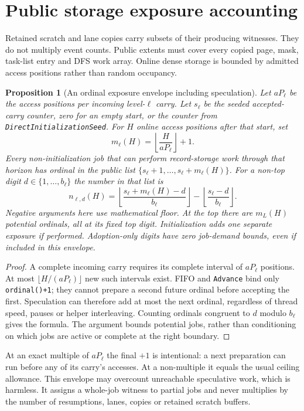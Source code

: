 \documentclass[11pt]{article}
\newtheorem{proposition}[theorem]{Proposition}
\theoremstyle{definition}
\theoremstyle{remark}
\begin{document}
\section{Public storage exposure accounting}
\label{sec:native-ledger}
Retained scratch and lane copies carry subsets of their producing witnesses.
They do not multiply event counts. Public extents must cover every copied
page, mask, task-list entry and DFS work array. Online dense storage is
bounded by admitted access positions rather than random occupancy.
\begin{proposition}[An ordinal exposure envelope including speculation]
\label{prop:ordinal-exposures}
Let $aP_\ell$ be the access positions per incoming level-$\ell$ carry.
Let $s_\ell$ be the seeded accepted-carry counter, zero for an empty
start, or the counter from \texttt{DirectInitializationSeed}. For $H$
online access positions after that start, set
\[
 m_\ell(H)=\left\lfloor\frac{H}{aP_\ell}\right\rfloor+1.
\]
Every non-initialization job that can perform record-storage work through
that horizon has ordinal in the public list
$\{s_\ell+1,\ldots,s_\ell+m_\ell(H)\}$.
For a non-top digit $d\in\{1,\ldots,b_\ell\}$ the number in that list is
\[
 n_{\ell,d}(H)=
 \left\lfloor\frac{s_\ell+m_\ell(H)-d}{b_\ell}\right\rfloor
 -\left\lfloor\frac{s_\ell-d}{b_\ell}\right\rfloor.
\]
Negative arguments here use mathematical floor. At the top there are
$m_L(H)$ potential ordinals, all at its fixed top digit. Initialization
adds one separate exposure if performed. Adoption-only digits have zero
job-demand bounds, even if included in this envelope.
\end{proposition}
\begin{proof}
A complete incoming carry requires its complete interval of $aP_\ell$
positions. At most $\lfloor H/(aP_\ell)\rfloor$ new such intervals exist.
FIFO and \texttt{Advance} bind only \texttt{ordinal()+1}; they cannot
prepare a second future ordinal before accepting the first. Speculation
can therefore add at most the next ordinal, regardless of thread speed,
pauses or helper interleaving. Counting ordinals congruent to $d$ modulo $b_\ell$ gives the formula.
The argument bounds potential jobs, rather than conditioning on which
jobs are active or complete at the right boundary.
\end{proof}
At an exact multiple of $aP_\ell$ the final $+1$ is intentional: a next
preparation can run before any of its carry's accesses. At a non-multiple
it equals the usual ceiling allowance. This envelope may overcount
unreachable speculative work, which is harmless. It assigns a whole-job
witness to partial jobs and never multiplies by the number of resumptions,
lanes, copies or retained scratch buffers.
\end{document}
